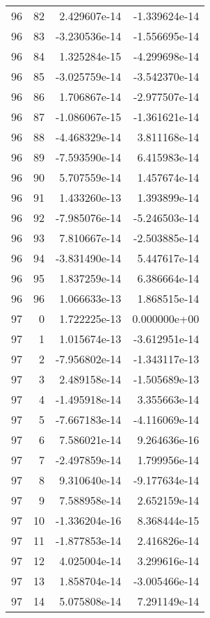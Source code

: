 \begin{tabular}{rrrr}
  96 &   82 &  2.429607e-14 & -1.339624e-14 \\
  96 &   83 & -3.230536e-14 & -1.556695e-14 \\
  96 &   84 &  1.325284e-15 & -4.299698e-14 \\
  96 &   85 & -3.025759e-14 & -3.542370e-14 \\
  96 &   86 &  1.706867e-14 & -2.977507e-14 \\
  96 &   87 & -1.086067e-15 & -1.361621e-14 \\
  96 &   88 & -4.468329e-14 &  3.811168e-14 \\
  96 &   89 & -7.593590e-14 &  6.415983e-14 \\
  96 &   90 &  5.707559e-14 &  1.457674e-14 \\
  96 &   91 &  1.433260e-13 &  1.393899e-14 \\
  96 &   92 & -7.985076e-14 & -5.246503e-14 \\
  96 &   93 &  7.810667e-14 & -2.503885e-14 \\
  96 &   94 & -3.831490e-14 &  5.447617e-14 \\
  96 &   95 &  1.837259e-14 &  6.386664e-14 \\
  96 &   96 &  1.066633e-13 &  1.868515e-14 \\
  97 &    0 &  1.722225e-13 &  0.000000e+00 \\
  97 &    1 &  1.015674e-13 & -3.612951e-14 \\
  97 &    2 & -7.956802e-14 & -1.343117e-13 \\
  97 &    3 &  2.489158e-14 & -1.505689e-13 \\
  97 &    4 & -1.495918e-14 &  3.355663e-14 \\
  97 &    5 & -7.667183e-14 & -4.116069e-14 \\
  97 &    6 &  7.586021e-14 &  9.264636e-16 \\
  97 &    7 & -2.497859e-14 &  1.799956e-14 \\
  97 &    8 &  9.310640e-14 & -9.177634e-14 \\
  97 &    9 &  7.588958e-14 &  2.652159e-14 \\
  97 &   10 & -1.336204e-16 &  8.368444e-15 \\
  97 &   11 & -1.877853e-14 &  2.416826e-14 \\
  97 &   12 &  4.025004e-14 &  3.299616e-14 \\
  97 &   13 &  1.858704e-14 & -3.005466e-14 \\
  97 &   14 &  5.075808e-14 &  7.291149e-14 \\

\end{tabular}

